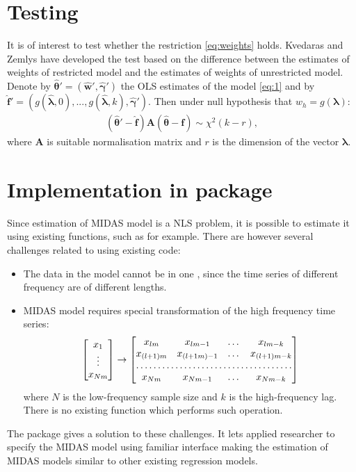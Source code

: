 \documentclass[nojss]{jss}
\begin{document}
\section{Testing}

It is of interest to test whether the restriction \eqref{eq:weights}
holds. Kvedaras and Zemlys \cite{kz:2012} have developed the test
based on the difference between the estimates of weights of restricted
model and the estimates of weights of unrestricted model. Denote by
$\hat{\bm{\theta}}'=(\hat{\bm{w}}',\hat{\bm{\gamma}}')$ the OLS estimates
of the model \eqref{eq:1} and by
$\hat{\bm{f}}'=(g(\hat{\bm{\lambda}},0),...,g(\hat{\bm{\lambda}},k),\hat{\bm{\gamma}}')$. Then
under null hypothesis that $w_h=g(\bm{\lambda})$: 
\begin{align*}
  (\bm{\hat{\theta}}'-\hat{\bm{f}})\bm{A}(\bm{\hat{\theta}}-\bm{f})\sim \chi^2(k-r),
\end{align*}
where $\bm{A}$ is suitable normalisation matrix and $r$ is the dimension of
the vector $\bm{\lambda}$.


\section[Implementation in midasr package]{Implementation in  package}

Since estimation of MIDAS model is a NLS problem, it is possible
to estimate it using existing  functions, such as
 for example. There are however several challenges related
to using existing  code: 
\begin{itemize}
\item The data in the model cannot be in one , since
  the time series of different frequency are of different lengths. 
\item MIDAS model requires special transformation of the high
  frequency time series:  
  \begin{align}\label{def:embed}
    \begin{bmatrix}
      x_1\\
      \vdots\\
      x_{Nm}
    \end{bmatrix}
    \to
    \begin{bmatrix}
      x_{lm} & x_{lm-1} & \dots & x_{lm-k}  \\
      x_{(l+1)m} & x_{(l+1m)-1}& \dots & x_{(l+1)m-k}\\
      \hdotsfor{4}\\
      x_{Nm} & x_{Nm-1} & \dots & x_{Nm-k }
    \end{bmatrix}
  \end{align}  
  where $N$ is the low-frequency sample size and $k$ is the
  high-frequency lag. There is no existing  function which
  performs such operation.
\end{itemize}
The package  gives a solution to these challenges. It lets
applied researcher to specify the MIDAS model using familiar
 interface making the estimation of MIDAS models similar
to other existing regression models.
\end{document}
